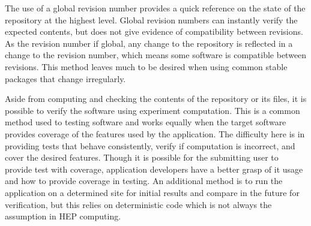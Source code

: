 \documentclass[sigconf]{acmart}
\begin{document}
The use of a global revision number provides a quick reference
on the state of the repository at the highest level.
Global revision numbers can instantly verify the expected
contents, but does not give evidence of compatibility between
revisions.
As the revision number if global, any change to the repository
is reflected in a change to the revision number, which means 
some software is compatible between revisions.
This method leaves much to be desired when using common stable
packages that change irregularly.

Aside from computing and checking the contents of the
repository or its files, it is possible to verify the
software using experiment computation.
This is a common method used to testing software
and works equally when the target software provides
coverage of the features used by the application.
The difficulty here is in providing tests that
behave consistently, verify if computation is
incorrect, and cover the desired features.
Though it is possible for the submitting user
to provide test with coverage, application
developers have a better grasp of it usage
and how to provide coverage in testing.
An additional method is to run the application
on a determined site for initial results and
compare in the future for verification, but
this relies on deterministic code which is 
not always the assumption in HEP computing.
\end{document}
